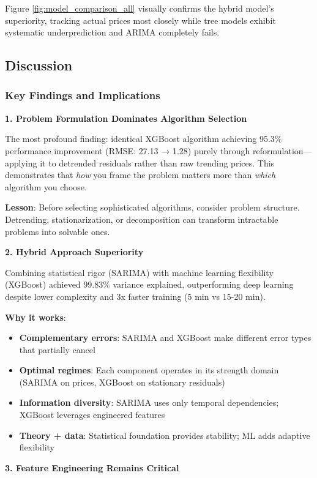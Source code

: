 Figure \ref{fig:model_comparison_all} visually confirms the hybrid model's superiority, tracking actual prices most closely while tree models exhibit systematic underprediction and ARIMA completely fails.

\subsection{Discussion}

\subsubsection{Key Findings and Implications}

\textbf{1. Problem Formulation Dominates Algorithm Selection}

The most profound finding: identical XGBoost algorithm achieving 95.3\% performance improvement (RMSE: 27.13 → 1.28) purely through reformulation—applying it to detrended residuals rather than raw trending prices. This demonstrates that \textit{how} you frame the problem matters more than \textit{which} algorithm you choose.

\textbf{Lesson}: Before selecting sophisticated algorithms, consider problem structure. Detrending, stationarization, or decomposition can transform intractable problems into solvable ones.

\textbf{2. Hybrid Approach Superiority}

Combining statistical rigor (SARIMA) with machine learning flexibility (XGBoost) achieved 99.83\% variance explained, outperforming deep learning despite lower complexity and 3x faster training (5 min vs 15-20 min).

\textbf{Why it works}:
\begin{itemize}
    \item \textbf{Complementary errors}: SARIMA and XGBoost make different error types that partially cancel
    \item \textbf{Optimal regimes}: Each component operates in its strength domain (SARIMA on prices, XGBoost on stationary residuals)
    \item \textbf{Information diversity}: SARIMA uses only temporal dependencies; XGBoost leverages engineered features
    \item \textbf{Theory + data}: Statistical foundation provides stability; ML adds adaptive flexibility
\end{itemize}

\textbf{3. Feature Engineering Remains Critical}

